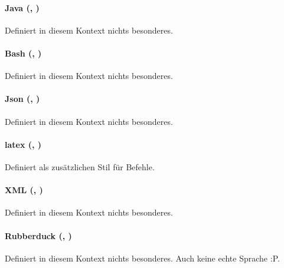 \documentclass{sopra-base}
\begin{document}
\paragraph{Java (, )}

Definiert in diesem Kontext nichts besonderes.

\paragraph{Bash (, )}

Definiert in diesem Kontext nichts besonderes.

\paragraph{Json (, )}

Definiert in diesem Kontext nichts besonderes.

\paragraph{latex (, )}

Definiert  als zusätzlichen Stil für Befehle.

\paragraph{XML (, )}

Definiert in diesem Kontext nichts besonderes.

\paragraph{Rubberduck (, )}

Definiert in diesem Kontext nichts besonderes. Auch keine echte Sprache :P.
\end{document}
